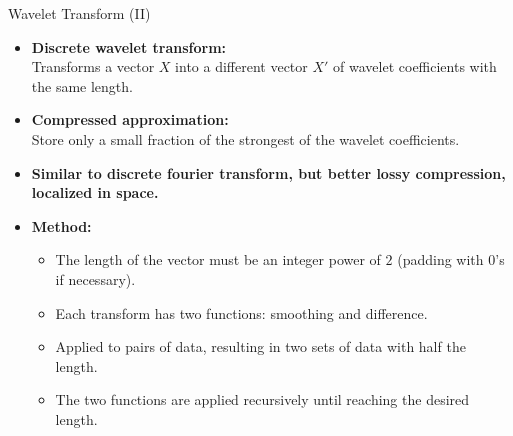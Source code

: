 \begin{frame}{Wavelet Transform (II)}
	\begin{itemize}
		\item \textbf{Discrete wavelet transform:}\\
		      Transforms a vector $X$ into a different vector $X'$ of wavelet
		      coefficients with the same length.
		\item \textbf{Compressed approximation:}\\
		      Store only a small fraction of the strongest of the wavelet
		      coefficients.
		\item \textbf{Similar to discrete fourier transform, but better lossy
			      compression, localized in space.}
		\item \textbf{Method:}
		      \begin{itemize}
			      \item The length of the vector must be an integer power of $2$
			            (padding with $0$'s if necessary).
			      \item Each transform has two functions: smoothing and difference.
			      \item Applied to pairs of data, resulting in two sets of data with
			            half the length.
			      \item The two functions are applied recursively until reaching the
			            desired length.
		      \end{itemize}
	\end{itemize}
\end{frame}

